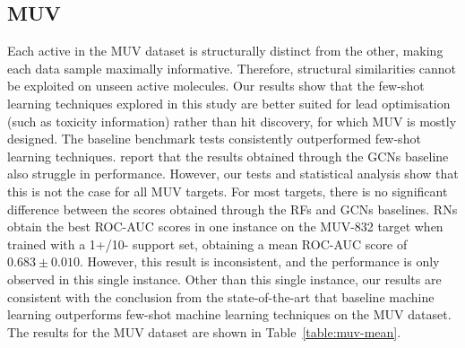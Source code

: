 \subsection{MUV}

Each active in the MUV dataset is structurally distinct from the other, making each data sample maximally informative. Therefore, structural similarities cannot be exploited on unseen active molecules. Our results show that the few-shot learning techniques explored in this study are better suited for lead optimisation (such as toxicity information) rather than hit discovery, for which MUV is mostly designed. The baseline benchmark tests consistently outperformed few-shot learning techniques. \citet{altae2017low} report that the results obtained through the GCNs baseline also struggle in performance. However, our tests and statistical analysis show that this is not the case for all MUV targets. For most targets, there is no significant difference between the scores obtained through the RFs and GCNs baselines. RNs obtain the best ROC-AUC scores in one instance on the MUV-832 target when trained with a 1+/10- support set, obtaining a mean ROC-AUC score of $0.683 \pm 0.010$. However, this result is inconsistent, and the performance is only observed in this single instance. Other than this single instance, our results are consistent with the conclusion from the state-of-the-art that baseline machine learning outperforms few-shot machine learning techniques on the MUV dataset. The results for the MUV dataset are shown in Table~\ref{table:muv-mean}. 

